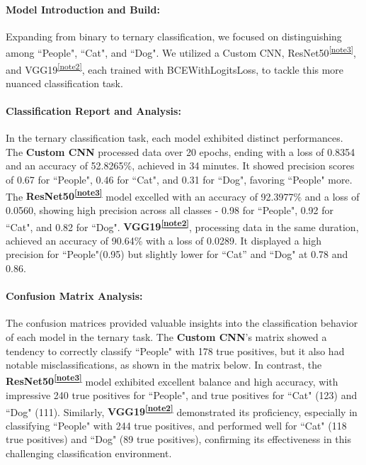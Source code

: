\documentclass{article} %
\begin{document}
\paragraph{Model Introduction and Build:}
Expanding from binary to ternary classification, we focused on distinguishing among ``People", ``Cat", and ``Dog". We utilized a Custom CNN, ResNet50\textsuperscript{\ref{note3}}, and VGG19\textsuperscript{\ref{note2}}, each trained with BCEWithLogitsLoss, to tackle this more nuanced classification task.

\paragraph{Classification Report and Analysis:}
In the ternary classification task, each model exhibited distinct performances. The \textbf{Custom CNN} processed data over 20 epochs, ending with a loss of 0.8354 and an accuracy of 52.8265\%, achieved in 34 minutes. It showed precision scores of 0.67 for ``People", 0.46 for ``Cat", and 0.31 for ``Dog", favoring ``People" more. The \textbf{ResNet50\textsuperscript{\ref{note3}}} model excelled with an accuracy of 92.3977\% and a loss of 0.0560, showing high precision across all classes - 0.98 for ``People", 0.92 for ``Cat", and 0.82 for ``Dog". \textbf{VGG19\textsuperscript{\ref{note2}}}, processing data in the same duration, achieved an accuracy of 90.64\% with a loss of 0.0289. It displayed a high precision for ``People"(0.95) but slightly lower for ``Cat'' and ``Dog" at 0.78 and 0.86.

\paragraph{Confusion Matrix Analysis:}
The confusion matrices provided valuable insights into the classification behavior of each model in the ternary task. The \textbf{Custom CNN}'s matrix showed a tendency to correctly classify ``People" with 178 true positives, but it also had notable misclassifications, as shown in the matrix below. In contrast, the \textbf{ResNet50\textsuperscript{\ref{note3}}} model exhibited excellent balance and high accuracy, with impressive 240 true positives for ``People", and true positives for ``Cat" (123) and ``Dog" (111). Similarly, \textbf{VGG19\textsuperscript{\ref{note2}}} demonstrated its proficiency, especially in classifying ``People" with 244 true positives, and performed well for ``Cat" (118 true positives) and ``Dog" (89 true positives), confirming its effectiveness in this challenging classification environment.
\end{document}
